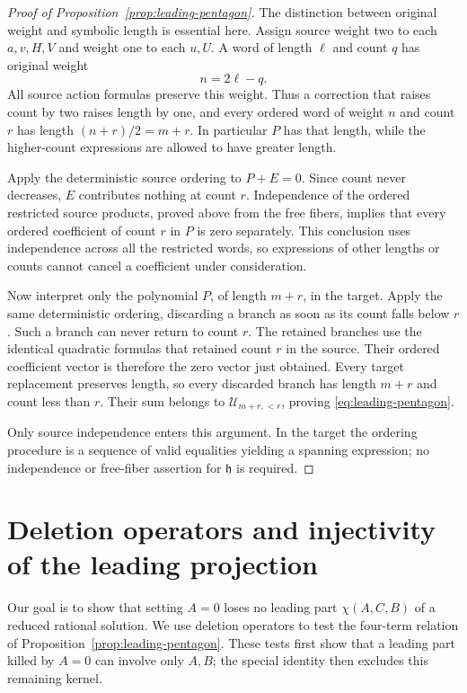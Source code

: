 \documentclass[11pt]{article}
\theoremstyle{definition}
\theoremstyle{remark}
\numberwithin{equation}{section}
\begin{document}
\begin{proof}[Proof of Proposition~\ref{prop:leading-pentagon}]
The distinction between original weight and symbolic length is
essential here.  Assign source weight two to each $a,v,H,V$ and
weight one to each $u,U$.  A word of length $\ell$ and count $q$ has
original weight
\begin{equation}\label{eq:weight-length-count}
 n=2\ell-q.
\end{equation}
All source action formulas preserve this weight.  Thus a correction
that raises count by two raises length by one, and every ordered
word of weight $n$ and count $r$ has length
$(n+r)/2=m+r$.  In particular $P$ has that length, while the
higher-count expressions are allowed to have greater length.

Apply the deterministic source ordering to $P+E=0$.  Since count
never decreases, $E$ contributes nothing at count $r$.  Independence
of the ordered restricted source products, proved above from the
free fibers, implies that every ordered coefficient of count $r$
in $P$ is zero separately.  This conclusion uses independence
across all the restricted words, so expressions of other lengths
or counts cannot cancel a coefficient under consideration.

Now interpret only the polynomial $P$, of length $m+r$, in the
target.  Apply the same deterministic ordering, discarding a branch
as soon as its count falls below $r$.  Such a branch can never return
to count $r$.  The retained branches use the identical quadratic
formulas that retained count $r$ in the source.  Their ordered
coefficient vector is therefore the zero vector just obtained.
Every target replacement preserves length, so every discarded
branch has length $m+r$ and count less than $r$.  Their sum belongs
to $\mathcal U_{m+r,<r}$, proving \eqref{eq:leading-pentagon}.

Only source independence enters this argument.  In the target the
ordering procedure is a sequence of valid equalities yielding a
spanning expression; no independence or free-fiber assertion for
$\mathfrak h$ is required.
\end{proof}

\section{Deletion operators and injectivity of the leading projection}
\label{sec:deletion}

Our goal is to show that setting $A=0$ loses no leading part
$\chi(A,C,B)$ of a reduced rational solution.  We use deletion
operators to test the four-term relation of
Proposition~\ref{prop:leading-pentagon}.  These tests first show that
a leading part killed by $A=0$ can involve only $A,B$; the special
identity then excludes this remaining kernel.
\end{document}
